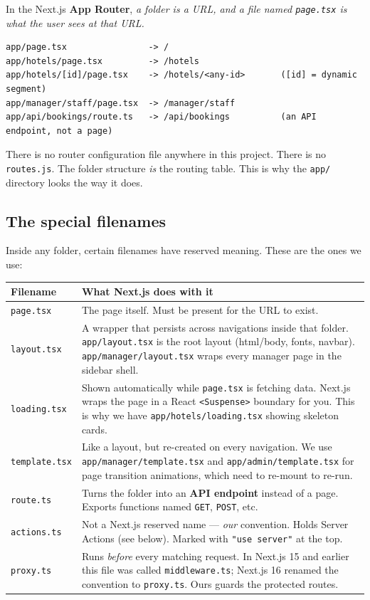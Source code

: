 \documentclass[11pt,a4paper]{article}
\newcommand{\file}[1]{\texttt{\small #1}}
\begin{document}
In the Next.js \textbf{App Router}, \emph{a folder is a URL, and a file named
\file{page.tsx} is what the user sees at that URL.}

\begin{lstlisting}
app/page.tsx                -> /
app/hotels/page.tsx         -> /hotels
app/hotels/[id]/page.tsx    -> /hotels/<any-id>       ([id] = dynamic segment)
app/manager/staff/page.tsx  -> /manager/staff
app/api/bookings/route.ts   -> /api/bookings          (an API endpoint, not a page)
\end{lstlisting}

There is no router configuration file anywhere in this project. There is no
\file{routes.js}. The folder structure \emph{is} the routing table. This is why
the \file{app/} directory looks the way it does.

\subsection{The special filenames}

Inside any folder, certain filenames have reserved meaning. These are the ones
we use:

\begin{longtable}{@{}p{2.9cm}p{11.9cm}@{}}
\toprule
\textbf{Filename} & \textbf{What Next.js does with it} \\
\midrule
\endhead
\file{page.tsx} & The page itself. Must be present for the URL to exist. \\
\addlinespace
\file{layout.tsx} & A wrapper that persists across navigations inside that
folder. \file{app/layout.tsx} is the root layout (html/body, fonts, navbar).
\file{app/manager/layout.tsx} wraps every manager page in the sidebar shell. \\
\addlinespace
\file{loading.tsx} & Shown automatically while \file{page.tsx} is fetching data.
Next.js wraps the page in a React \texttt{<Suspense>} boundary for you. This is
why we have \file{app/hotels/loading.tsx} showing skeleton cards. \\
\addlinespace
\file{template.tsx} & Like a layout, but re-created on every navigation. We use
\file{app/manager/template.tsx} and \file{app/admin/template.tsx} for page
transition animations, which need to re-mount to re-run. \\
\addlinespace
\file{route.ts} & Turns the folder into an \textbf{API endpoint} instead of a
page. Exports functions named \texttt{GET}, \texttt{POST}, etc. \\
\addlinespace
\file{actions.ts} & Not a Next.js reserved name --- \emph{our} convention. Holds
Server Actions (see below). Marked with \texttt{"use server"} at the top. \\
\addlinespace
\file{proxy.ts} & Runs \emph{before} every matching request. In Next.js 15 and
earlier this file was called \file{middleware.ts}; Next.js 16 renamed the
convention to \file{proxy.ts}. Ours guards the protected routes. \\
\bottomrule
\end{longtable}
\end{document}
